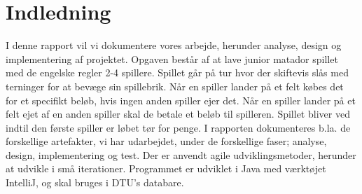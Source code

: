 
\section{Indledning}
I denne rapport vil vi dokumentere vores arbejde, herunder analyse, design og implementering af projektet. Opgaven består af at lave junior matador spillet med de engelske regler 2-4 spillere. Spillet går på tur hvor der skiftevis slås med terninger for at bevæge sin spillebrik. Når en spiller lander på et felt købes det for et specifikt beløb, hvis ingen anden spiller ejer det. Når en spiller lander på et felt ejet af en anden spiller skal de betale et beløb til spilleren. Spillet bliver ved indtil den første spiller er løbet tør for penge. I rapporten dokumenteres b.la. de forskellige artefakter, vi har udarbejdet, under de forskellige faser; analyse, design, implementering og test. Der er anvendt agile udviklingsmetoder, herunder at udvikle i små iterationer. Programmet er udviklet i Java med værktøjet IntelliJ, og skal bruges i DTU’s databare.
